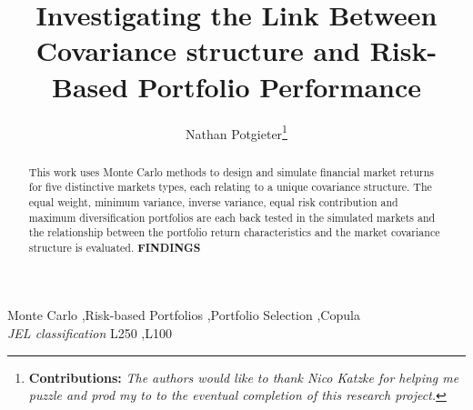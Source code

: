\documentclass[11pt,preprint, authoryear]{elsarticle}
\numberwithin{equation}{section}
\numberwithin{figure}{section}
\numberwithin{table}{section}
\let\rmarkdownfootnote\footnote%
\def\footnote{\protect\rmarkdownfootnote}
\begin{document}
\begin{frontmatter}  %

\title{Investigating the Link Between Covariance structure and Risk-Based
Portfolio Performance}





\author[Add1]{Nathan Potgieter\footnote{\textbf{Contributions:} \newline \emph{The
  authors would like to thank Nico Katzke for helping me puzzle and prod
  my to to the eventual completion of this research project.}}}





\address[Add1]{Stellenbosch University, Stellenbosch, South Africa}


\begin{abstract}
\small{
This work uses Monte Carlo methods to design and simulate financial
market returns for five distinctive markets types, each relating to a
unique covariance structure. The equal weight, minimum variance, inverse
variance, equal risk contribution and maximum diversification portfolios
are each back tested in the simulated markets and the relationship
between the portfolio return characteristics and the market covariance
structure is evaluated. \textbf{FINDINGS}
}
\end{abstract}

\vspace{1cm}

\begin{keyword}
\footnotesize{
Monte Carlo \sep Risk-based Portfolios \sep Portfolio Selection
\sep Copula \\ \vspace{0.3cm}
\textit{JEL classification} L250 \sep L100
}
\end{keyword}
\vspace{0.5cm}
\end{frontmatter}



\pagestyle{fancy}
\chead{}
\rhead{}
\lfoot{}
\lhead{}
\cfoot{}


\headsep 35pt %
\end{document}
